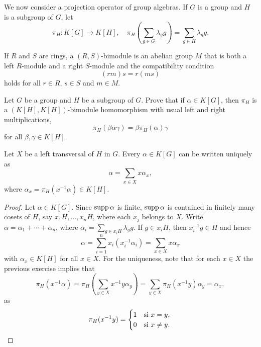 We now consider a projection operator of group algebras. If $G$ 
is a group and $H$ is a subgroup of $G$, let 
\[
	\pi_H\colon K[G]\to K[H],\quad
	\pi_H\left(\sum_{g\in G}\lambda_gg\right)=\sum_{g\in H}\lambda_gg.
\]

If $R$ and $S$ are rings, a $(R,S)$-bimodule is an abelian group
$M$ that is both a left $R$-module and a right $S$-module 
and the compatibility condition 
\[
(rm)s = r(ms)
\]
holds for all $r\in R$, $s\in S$ and $m\in M$.


\begin{exercise}
	Let $G$ be a group and $H$ be a subgroup of $G$. Prove that
	if $\alpha\in
	K[G]$, then $\pi_H$ is a $(K[H],K[H])$-bimodule homomorphism
	with usual left and right multiplications,
	\[
		\pi_H(\beta\alpha\gamma)=\beta\pi_H(\alpha)\gamma
	\]
	for all $\beta,\gamma\in K[H]$.
\end{exercise}


\begin{lemma}
	\label{lem:escritura}
	Let $X$ be a left transversal of $H$ in $G$. Every $\alpha\in K[G]$ can be written
	uniquely as 
	\[
	\alpha=\sum_{x\in X}x\alpha_x,
	\]
	where $\alpha_x=\pi_H(x^{-1}\alpha)\in K[H]$.
\end{lemma}

\begin{proof}
	Let $\alpha\in K[G]$. Since $\operatorname{supp}\alpha$ is finite, $\operatorname{supp}\alpha$ is contained 
    in finitely many cosets of $H$, say $x_1H,\dots,x_nH$, where each 
	$x_j$ belongs to $X$. Write $\alpha=\alpha_1+\cdots+\alpha_n$,
	where $\alpha_i=\sum_{g\in x_iH}\lambda_gg$. If $g\in x_iH$, then 
	$x_i^{-1}g\in H$ and hence 
	\[
		\alpha=\sum_{i=1}^n x_i(x_i^{-1}\alpha_i)=\sum_{x\in X}x\alpha_x
	\]
	with $\alpha_x\in K[H]$ for all $x\in X$. For the uniqueness, note that 
	for each  $x\in X$ the previous exercise implies that  
	\[
		\pi_H(x^{-1}\alpha)
		=\pi_H\left(\sum_{y\in X}x^{-1}y\alpha_y\right)
		=\sum_{y\in X}\pi_H(x^{-1}y)\alpha_y=\alpha_x, 
	\]
	as  
	\[
		\pi_H(x^{-1}y)=\begin{cases}
		1 & \text{si $x=y$},\\
		0 & \text{si $x\ne y$}.
	\end{cases}\qedhere 
	\]
\end{proof}

